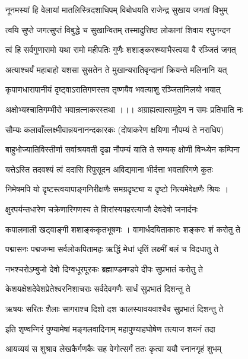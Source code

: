 \twolineshloka
{नूनमस्यां हि वेलायां मातलिस्त्रिदशाधिपम्}
{विबोधयति राजेन्द्र सुखाय जगतां विभुम्}%

\twolineshloka
{त्वयि सुप्ते जगत्सुप्तं विबुद्धे च सुखान्वितम्}
{तस्मादुत्तिष्ठ लोकानां शिवाय रघुनन्दन}%

\twolineshloka
{त्वं हि सर्वगुणारामो यथा रामो महीपतिः}
{गुणैः शशाङ्करश्म्याभैस्त्वया वै रञ्जितं जगत्}%

\twolineshloka
{अत्याश्चर्यं महाबाहो यशसा सुसतेन ते}
{मुखान्यरातिवृन्दानां क्रियन्ते मलिनानि यत्} %

\twolineshloka
{कृपाणधारापानीयं दृष्ट्वाऽरातिगणस्तव}
{तृष्णयैव भवत्याशु रञ्जितानिलयो भयात्}%

\twolineshloka
{अक्षोभ्यश्चातिगम्भीरो भवान्रत्नाकरस्तथा ।।।}
{अग्राह्यत्वात्समुद्रेण न समः प्रतिभाति नः}%

\twolineshloka
{सौम्यः कलावाँल्लक्ष्मीवान्नयनानन्दकारकः}
{(दोषाकरेण क्षयिणा नौपम्यं ते नराधिप)}%

\twolineshloka
{बाहुभोज्यातिविस्तीर्णा सर्वाश्रयवती दृढा}
{नौपम्यं याति ते सम्यक् क्षोणी विन्ध्येन कम्पिना}%

\twolineshloka
{यत्तेऽस्ति तदवश्यं त्वं ददासि रिपुसूदन}
{अविद्यमाना भीर्दत्ता भवतारिगणे कुतः}%

\twolineshloka
{निमेषमपि यो दृष्टस्त्वयापाङ्गनिरीक्षणैः}
{समग्रदृष्ट्या य दृष्टो नित्यमेवेक्षणैः श्रियः ।}%

\twolineshloka
{क्षुरपर्यन्तधारेण चक्रेणारिगणस्य ते}
{शिरांस्यपहरत्याजौ देवदेवो जनार्दनः}%

\twolineshloka
{कपालमाली खट्वाङ्गी शशाङ्ककृतभूषणः ।}
{वामार्धदयिताकारः शङ्करः शं करोतु ते}%

\twolineshloka
{पद्मासनः पद्मजन्मा सर्वलोकपितामहः}
{ऋद्धिं मेधां धृतिं लक्ष्मीं बलं च विदधातु ते}%

\twolineshloka
{नभश्चरोऽम्बुजो देवो दिग्वधूरपूरकः}
{ब्रह्माण्डमण्डपे दीपः सुप्रभातं करोतु ते} %

\twolineshloka
{केशयक्षेशदेवेशप्रेतेश्वरनिशाचराः}
{सर्वदेवगणैः सार्धं सुप्रभातं दिशन्तु ते}%

\twolineshloka
{ऋषयः सरितः शैलाः सागराश्च दिशो दश}
{कालस्यावयवाश्चैव सुप्रभातं दिशन्तु ते}%

\twolineshloka
{इति शृण्वन्गिरं पुण्यामेषां मङ्गलवादिनाम्}
{महापुण्याहघोषेण तत्याज शयनं तदा}%

\twolineshloka
{आयव्ययं स शुश्राव लेखकैर्गणकैः सह}
{वेगोत्सर्गं ततः कृत्वा ययौ स्नानगृहं शुभम्}%

